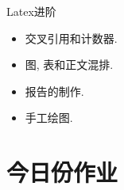\documentclass{beamer}
\begin{document}
\begin{frame}{Latex进阶}
  \begin{itemize}
  \item<1-> 交叉引用和计数器.
  \item<2-> 图, 表和正文混排.
  \item<3-> 报告的制作.
  \item<4-> 手工绘图.
  \end{itemize}
\end{frame}

\section{今日份作业}
\end{document}
